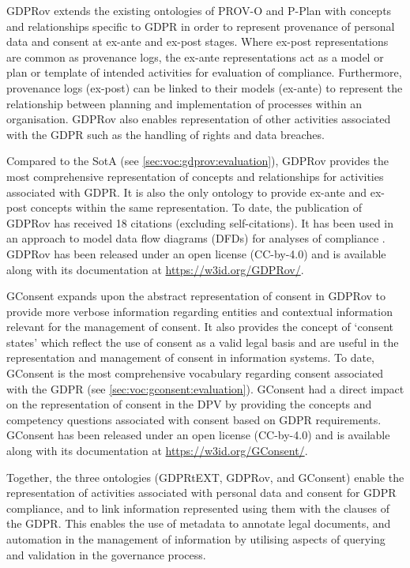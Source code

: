 GDPRov extends the existing ontologies of PROV-O and P-Plan with concepts and relationships specific to GDPR in order to represent provenance of personal data and consent at ex-ante and ex-post stages. Where ex-post representations are common as provenance logs, the ex-ante representations act as a model or plan or template of intended activities for evaluation of compliance. Furthermore, provenance logs (ex-post) can be linked to their models (ex-ante) to represent the relationship between planning and implementation of processes within an organisation. GDPRov also enables representation of other activities associated with the GDPR such as the handling of rights and data breaches.

Compared to the SotA (see \autoref{sec:voc:gdprov:evaluation}), GDPRov provides the most comprehensive representation of concepts and relationships for activities associated with GDPR.
It is also the only ontology to provide ex-ante and ex-post concepts within the same representation.
To date, the publication of GDPRov has received 18 citations (excluding self-citations). It has been used in an approach to model data flow diagrams (DFDs) for analyses of compliance \cite{debruyneOntologyRepresentingAnnotating2019}.
GDPRov has been released under an open license (CC-by-4.0) and is available along with its documentation at \url{https://w3id.org/GDPRov/}.

GConsent expands upon the abstract representation of consent in GDPRov to provide more verbose information regarding entities and contextual information relevant for the management of consent. It also provides the concept of `consent states' which reflect the use of consent as a valid legal basis and are useful in the  representation and management of consent in information systems. To date, GConsent is the most comprehensive vocabulary regarding consent associated with the GDPR (see \autoref{sec:voc:gconsent:evaluation}).
GConsent had a direct impact on the representation of consent in the DPV by providing the concepts and competency questions associated with consent based on GDPR requirements.
GConsent has been released under an open license (CC-by-4.0) and is available along with its documentation at \url{https://w3id.org/GConsent/}.

Together, the three ontologies (GDPRtEXT, GDPRov, and GConsent) enable the representation of activities associated with personal data and consent for GDPR compliance, and to link information represented using them with the clauses of the GDPR.
This enables the use of metadata to annotate legal documents, and automation in the management of information by utilising aspects of querying and validation in the governance process.

